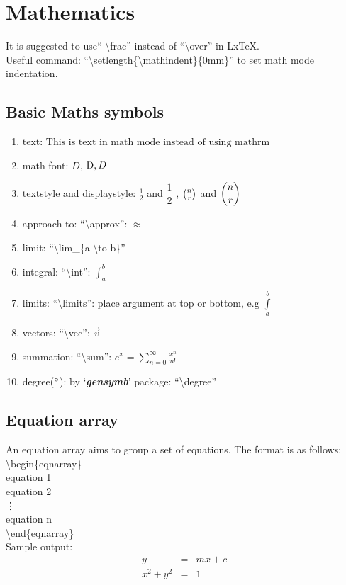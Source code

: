 \documentclass[10pt,a4paper,fleqn]{article}
\def\bslash{\textbackslash} %
\def\d{\displaystyle}
\begin{document}
\section{Mathematics}
It is suggested to use`` \bslash frac'' instead of ``\bslash over'' in LxTeX.\\
Useful command: ``\bslash setlength\{\bslash mathindent\}\{0mm\}'' to set math mode indentation.
\subsection{Basic Maths symbols}
\begin{enumerate}
\item text: $\text{This is text in math mode instead of using mathrm}$ %
\item math font: $D$, $\mathrm{D}, \mathnormal{D}$ %
\item textstyle and displaystyle: $\tfrac{1}{2}$ and $\dfrac{1}{2}$ , $\tbinom{n}{r}$ and $\dbinom{n}{r}$
\item approach to: ``\bslash approx'': $\approx$
\item limit: ``\bslash lim\_\{a \bslash to b\}''
\item integral: ``\bslash int'': $\int_a^b$
\item limits: ``\bslash limits'': place argument at top or bottom, e.g $\int \limits_a^b$
\item vectors: ``\bslash vec'': $\vec{v}$
\item summation: ``\bslash sum'': $\d{e^x=\sum_{n=0}^{\infty}\frac{x^n}{n!}}$
\item degree($\degree$): by `\textbf{\textit{gensymb}}' package: ``\bslash degree''
\end{enumerate}
\clearpage
\subsection{Equation array}
An equation array aims to group a set of equations. The format is as follows:\\
\bslash begin\{eqnarray\}\\
equation 1\\
equation 2\\
\vdots\\
equation n\\
\bslash end\{eqnarray\}\\
Sample output: 
\begin{eqnarray}
y &=& mx + c\\  %
x^2 + y^2 &=& 1
\end{eqnarray}
\end{document}
